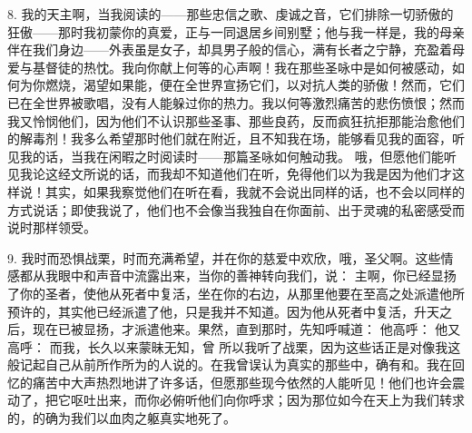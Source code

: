 8. 我的天主啊，当我阅读的——那些忠信之歌、虔诚之音，它们排除一切骄傲的狂傲——那时我初蒙你的真爱，正与一同退居乡间别墅；他与我一样是，我的母亲伴在我们身边——外表虽是女子，却具男子般的信心，满有长者之宁静，充盈着母爱与基督徒的热忱。我向你献上何等的心声啊！我在那些圣咏中是如何被感动，如何为你燃烧，渴望如果能，便在全世界宣扬它们，以对抗人类的骄傲！然而，它们已在全世界被歌唱，没有人能躲过你的热力。我以何等激烈痛苦的悲伤愤恨；然而我又怜悯他们，因为他们不认识那些圣事、那些良药，反而疯狂抗拒那能治愈他们的解毒剂！我多么希望那时他们就在附近，且不知我在场，能够看见我的面容，听见我的话，当我在闲暇之时阅读时——那篇圣咏如何触动我。 哦，但愿他们能听见我论这经文所说的话，而我却不知道他们在听，免得他们以为我是因为他们才这样说！其实，如果我察觉他们在听在看，我就不会说出同样的话，也不会以同样的方式说话；即使我说了，他们也不会像当我独自在你面前、出于灵魂的私密感受而说时那样领受。\par

9. 我时而恐惧战栗，时而充满希望，并在你的慈爱中欢欣，哦，圣父啊。这些情感都从我眼中和声音中流露出来，当你的善神转向我们，说： 主啊，你已经显扬了你的圣者，使他从死者中复活，坐在你的右边，从那里他要在至高之处派遣他所预许的，其实他已经派遣了他，只是我并不知道。因为他从死者中复活，升天之后，现在已被显扬，才派遣他来。果然，直到那时，先知呼喊道： 他高呼： 他又高呼： 而我，长久以来蒙昧无知，曾 所以我听了战栗，因为这些话正是对像我这般记起自己从前所作所为的人说的。在我曾误认为真实的那些中，确有和。我在回忆的痛苦中大声热烈地讲了许多话，但愿那些现今依然的人能听见！他们也许会震动了，把它呕吐出来，而你必俯听他们向你呼求；因为那位如今在天上为我们转求的，的确为我们以血肉之躯真实地死了。\par

